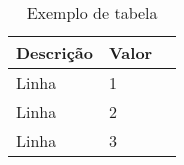 \begin{table}[h]
\centering
\caption{Exemplo de tabela}
\label{tab:exemplo}
\vspace{0.5cm}
\begin{tabular}{l|lr}
 
Descrição & Valor \\ %
\hline                               %
Linha & 1 \\
Linha & 2 \\
Linha & 3 
\end{tabular}
\end{table}